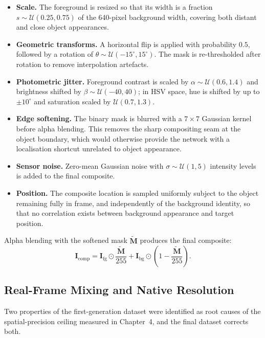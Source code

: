 \begin{itemize}
    \item \textbf{Scale.} The foreground is resized so that its width is a fraction $s \sim \mathcal{U}(0.25, 0.75)$ of the 640-pixel background width, covering both distant and close object appearances.
    \item \textbf{Geometric transforms.} A horizontal flip is applied with probability $0.5$, followed by a rotation of $\theta \sim \mathcal{U}(-15^{\circ}, 15^{\circ})$. The mask is re-thresholded after rotation to remove interpolation artefacts.
    \item \textbf{Photometric jitter.} Foreground contrast is scaled by $\alpha \sim \mathcal{U}(0.6, 1.4)$ and brightness shifted by $\beta \sim \mathcal{U}(-40, 40)$; in HSV space, hue is shifted by up to $\pm 10^{\circ}$ and saturation scaled by $\mathcal{U}(0.7, 1.3)$.
    \item \textbf{Edge softening.} The binary mask is blurred with a $7 \times 7$ Gaussian kernel before alpha blending. This removes the sharp compositing seam at the object boundary, which would otherwise provide the network with a localisation shortcut unrelated to object appearance.
    \item \textbf{Sensor noise.} Zero-mean Gaussian noise with $\sigma \sim \mathcal{U}(1, 5)$ intensity levels is added to the final composite.
    \item \textbf{Position.} The composite location is sampled uniformly subject to the object remaining fully in frame, and independently of the background identity, so that no correlation exists between background appearance and target position.
\end{itemize}

Alpha blending with the softened mask $\tilde{\mathbf{M}}$ produces the final composite:
\begin{equation}
    \mathbf{I}_{\mathrm{comp}} = \mathbf{I}_{\mathrm{fg}} \odot \frac{\tilde{\mathbf{M}}}{255} + \mathbf{I}_{\mathrm{bg}} \odot \left(1 - \frac{\tilde{\mathbf{M}}}{255}\right).
\end{equation}

\subsection{Real-Frame Mixing and Native Resolution}
\label{subsec:realframe_mixing}
 
Two properties of the first-generation dataset were identified as root causes
of the spatial-precision ceiling measured in Chapter~4, and the final dataset
corrects both.
 
